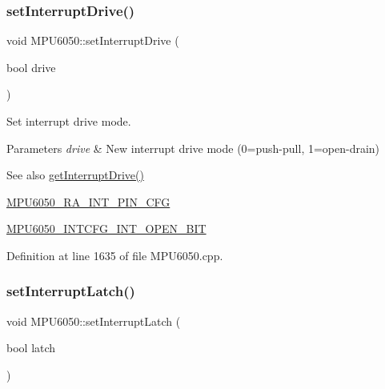 \subsubsection{\texorpdfstring{setInterruptDrive()}{setInterruptDrive()}}
{\footnotesize\ttfamily void M\+P\+U6050\+::set\+Interrupt\+Drive (\begin{DoxyParamCaption}\item[{bool}]{drive }\end{DoxyParamCaption})}

Set interrupt drive mode. 
\begin{DoxyParams}{Parameters}
{\em drive} & New interrupt drive mode (0=push-\/pull, 1=open-\/drain) \\
\hline
\end{DoxyParams}
\begin{DoxySeeAlso}{See also}
\mbox{\hyperlink{classMPU6050_af66e6c7b1885dcf452e73371790fddfd}{get\+Interrupt\+Drive()}} 

\mbox{\hyperlink{MPU6050_8h_a82344e1daef2bac2e0d938319528be6c}{M\+P\+U6050\+\_\+\+R\+A\+\_\+\+I\+N\+T\+\_\+\+P\+I\+N\+\_\+\+C\+FG}} 

\mbox{\hyperlink{MPU6050_8h_ae8cef0becbc209ac15fea3d86261d324}{M\+P\+U6050\+\_\+\+I\+N\+T\+C\+F\+G\+\_\+\+I\+N\+T\+\_\+\+O\+P\+E\+N\+\_\+\+B\+IT}} 
\end{DoxySeeAlso}


Definition at line 1635 of file M\+P\+U6050.\+cpp.


\begin{DoxyCode}{0}

\end{DoxyCode}
\mbox{\label{classMPU6050_abf9ccf9eb6c7156e6660abb76734920a}} 
\subsubsection{\texorpdfstring{setInterruptLatch()}{setInterruptLatch()}}
{\footnotesize\ttfamily void M\+P\+U6050\+::set\+Interrupt\+Latch (\begin{DoxyParamCaption}\item[{bool}]{latch }\end{DoxyParamCaption})}

